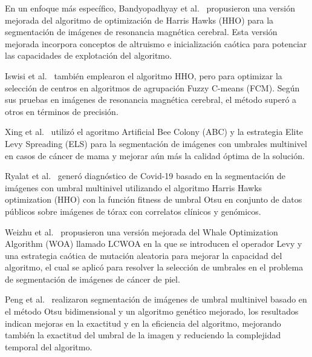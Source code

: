 \documentclass[conference]{IEEEtran}
\begin{document}

\noindent En un enfoque más específico, Bandyopadhyay et al.~\cite{Bandyopadhyay2021} propusieron una versión mejorada del algoritmo de optimización de Harris Hawks (HHO) para la segmentación de imágenes de resonancia magnética cerebral. Esta versión mejorada incorpora conceptos de altruismo e inicialización caótica para potenciar las capacidades de explotación del algoritmo.

\noindent Iswisi et al.~\cite{Iswisi2021} también emplearon el algoritmo HHO, pero para optimizar la selección de centros en algoritmos de agrupación Fuzzy C-means (FCM). Según sus pruebas en imágenes de resonancia magnética cerebral, el método superó a otros en términos de precisión.


\noindent Xing et al.~\cite{Xing2023} utilizó el agoritmo Artificial Bee Colony (ABC) y la estrategia Elite Levy Spreading (ELS) para la segmentación de imágenes con umbrales multinivel en casos de cáncer de mama y mejorar aún más la calidad óptima de la solución.

\noindent Ryalat et al.~\cite{Ryalat2022} generó diagnóstico de Covid-19 basado en la segmentación de imágenes con umbral multinivel utilizando el algoritmo Harris Hawks optimization (HHO) con la función fitness de umbral Otsu en conjunto de datos públicos sobre imágenes de tórax con correlatos clínicos y genómicos.

\noindent Weizhu et al.~\cite{Weizhu2022} propusieron una versión mejorada del Whale Optimization Algorithm (WOA) llamado LCWOA en la que se introducen el operador Levy y una estrategia caótica de mutación aleatoria para mejorar la capacidad del algoritmo, el cual se aplicó para resolver la selección de umbrales en el problema de segmentación de imágenes de cáncer de piel.

\noindent Peng et al.~\cite{Peng2023} realizaron segmentación de imágenes de umbral multinivel basado en el método Otsu bidimensional y un algoritmo genético mejorado, los resultados indican mejoras en la exactitud y en la eficiencia del algoritmo, mejorando también la exactitud del umbral de la imagen y reduciendo la complejidad temporal del algoritmo.
\end{document}
